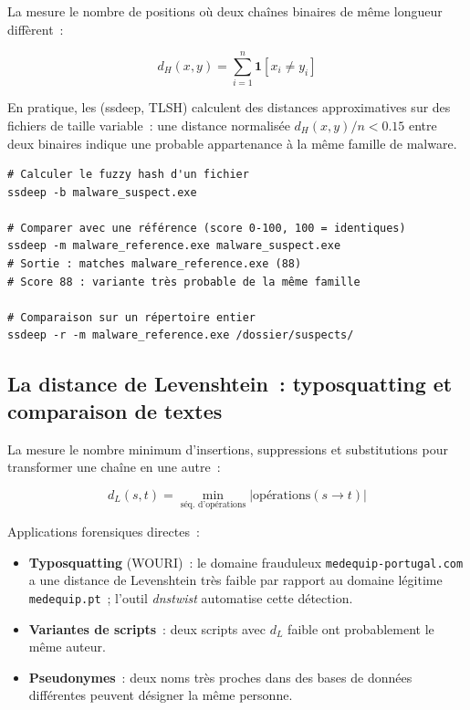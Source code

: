 La  mesure le nombre
de positions où deux chaînes binaires de même longueur diffèrent~:

\begin{equation}
d_H(x, y) = \sum_{i=1}^{n} \mathbf{1}[x_i \neq y_i]
\label{eq:hamming}
\end{equation}

En pratique, les  (ssdeep, TLSH)
calculent des distances approximatives sur des fichiers de taille variable~:
une distance normalisée $d_H(x,y)/n < 0.15$ entre deux binaires indique
une probable appartenance à la même famille de malware.

\begin{lstlisting}[language=bash_forensique,
    caption={Fuzzy hashing avec ssdeep}]
# Calculer le fuzzy hash d'un fichier
ssdeep -b malware_suspect.exe

# Comparer avec une référence (score 0-100, 100 = identiques)
ssdeep -m malware_reference.exe malware_suspect.exe
# Sortie : matches malware_reference.exe (88)
# Score 88 : variante très probable de la même famille

# Comparaison sur un répertoire entier
ssdeep -r -m malware_reference.exe /dossier/suspects/
\end{lstlisting}

\subsection{La distance de Levenshtein~: typosquatting et comparaison de textes}

La  mesure
le nombre minimum d'insertions, suppressions et substitutions pour transformer
une chaîne en une autre~:

\begin{equation}
d_L(s, t) = \min_{\text{séq. d'opérations}} |\text{opérations}(s \to t)|
\label{eq:levenshtein}
\end{equation}

Applications forensiques directes~:
\begin{itemize}
    \item \textbf{Typosquatting} (WOURI)~: le domaine frauduleux
          \texttt{medequip-portugal.com} a une distance de Levenshtein très faible
          par rapport au domaine légitime \texttt{medequip.pt}~; l'outil
          \textit{dnstwist} automatise cette détection.
    \item \textbf{Variantes de scripts}~: deux scripts avec $d_L$ faible ont
          probablement le même auteur.
    \item \textbf{Pseudonymes}~: deux noms très proches dans des bases de données
          différentes peuvent désigner la même personne.
\end{itemize}

